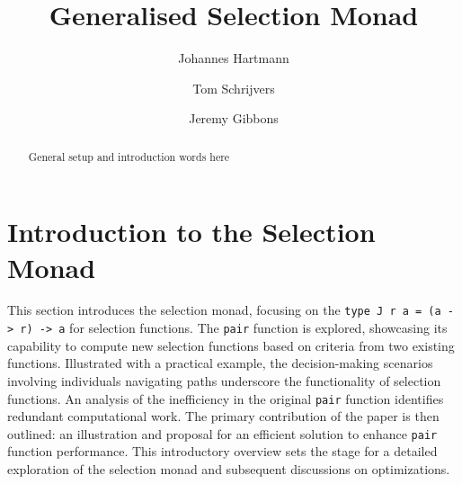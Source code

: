 \documentclass[runningheads]{llncs}
\newcommand{\ignore}[1]{}
\begin{document}
\title{Generalised Selection Monad}

\author{
    Johannes Hartmann \and 
    Tom Schrijvers\and 
    Jeremy Gibbons
}
%


%
\maketitle              %
%
\begin{abstract}
General setup and introduction words here

\end{abstract}
%
%
%
\ignore{

> {-# LANGUAGE ImpredicativeTypes #-}
> {-# LANGUAGE ScopedTypeVariables #-}

> import Prelude hiding ((>>=), return, pure, (<*>), fmap, sequence, Left, Right)

}

\section{Introduction to the Selection
Monad}\label{introduction-to-the-selection-monad}

This section introduces the selection monad, focusing on the
\texttt{type\ J\ r\ a\ =\ (a\ -\textgreater{}\ r)\ -\textgreater{}\ a}
for selection functions. The \texttt{pair} function is explored,
showcasing its capability to compute new selection functions based on
criteria from two existing functions. Illustrated with a practical
example, the decision-making scenarios involving individuals navigating
paths underscore the functionality of selection functions. An analysis
of the inefficiency in the original \texttt{pair} function identifies
redundant computational work. The primary contribution of the paper is
then outlined: an illustration and proposal for an efficient solution to
enhance \texttt{pair} function performance. This introductory overview
sets the stage for a detailed exploration of the selection monad and
subsequent discussions on optimizations.
\end{document}
